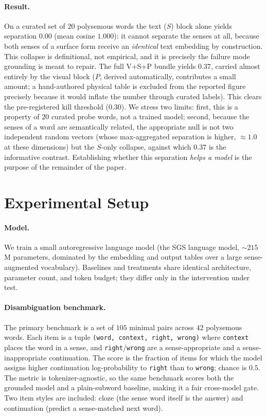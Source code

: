 \documentclass[twoside,11pt]{article}
\begin{document}
\paragraph{Result.}
On a curated set of $20$ polysemous words the text ($S$) block alone yields separation $0.00$ (mean cosine $1.000$): it cannot separate the senses at all, because both senses of a surface form receive an \emph{identical} text embedding by construction. This collapse is definitional, not empirical, and it is precisely the failure mode grounding is meant to repair. The full V+S+P bundle yields $0.37$, carried almost entirely by the visual block ($P$, derived automatically, contributes a small amount; a hand-authored physical table is excluded from the reported figure precisely because it would inflate the number through curated labels). This clears the pre-registered kill threshold ($0.30$). We stress two limits: first, this is a property of $20$ curated probe words, not a trained model; second, because the senses of a word are semantically related, the appropriate null is not two independent random vectors (whose max-aggregated separation is higher, $\approx 1.0$ at these dimensions) but the $S$-only collapse, against which $0.37$ is the informative contrast. Establishing whether this separation \emph{helps a model} is the purpose of the remainder of the paper.

\section{Experimental Setup}

\paragraph{Model.}
We train a small autoregressive language model (the SGS language model, $\sim$$215$M parameters, dominated by the embedding and output tables over a large sense-augmented vocabulary). Baselines and treatments share identical architecture, parameter count, and token budget; they differ only in the intervention under test.

\paragraph{Disambiguation benchmark.}
The primary benchmark is a set of $105$ minimal pairs across $42$ polysemous words. Each item is a tuple \texttt{(word, context, right, wrong)} where \texttt{context} places the word in a sense, and \texttt{right}/\texttt{wrong} are a sense-appropriate and a sense-inappropriate continuation. The score is the fraction of items for which the model assigns higher continuation log-probability to \texttt{right} than to \texttt{wrong}; chance is $0.5$. The metric is tokenizer-agnostic, so the same benchmark scores both the grounded model and a plain-subword baseline, making it a fair cross-model gate. Two item styles are included: cloze (the sense word itself is the answer) and continuation (predict a sense-matched next word).
\end{document}
